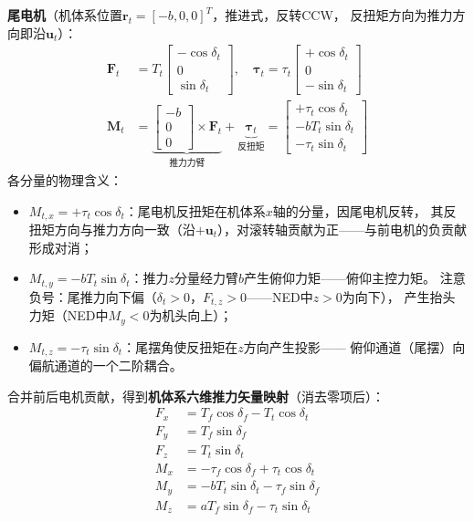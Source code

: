 \documentclass[a4paper,12pt]{ctexart}
\theoremstyle{plain}
\theoremstyle{definition}
\begin{document}
\textbf{尾电机}（机体系位置$\bm{r}_t = [-b, 0, 0]^T$，推进式，反转CCW，
反扭矩方向为推力方向即沿$\bm{u}_t$）：
\begin{align}
    \bm{F}_t &= T_t \begin{bmatrix} -\cos\delta_t \\ 0 \\ \sin\delta_t \end{bmatrix},
    \quad
    \bm{\tau}_t = \tau_t \begin{bmatrix} +\cos\delta_t \\ 0 \\ -\sin\delta_t \end{bmatrix}
    \label{eq:rear_force} \\
    \bm{M}_t &= \underbrace{\begin{bmatrix} -b \\ 0 \\ 0 \end{bmatrix} \times \bm{F}_t}_{\text{推力力臂}}
             + \underbrace{\bm{\tau}_t}_{\text{反扭矩}}
             = \begin{bmatrix}
                 +\tau_t \cos\delta_t \\
                 -b T_t \sin\delta_t \\
                 -\tau_t \sin\delta_t
               \end{bmatrix}
    \label{eq:rear_moment}
\end{align}
各分量的物理含义：
\begin{itemize}
    \item $M_{t,x} = +\tau_t \cos\delta_t$：尾电机反扭矩在机体系$x$轴的分量，因尾电机反转，
          其反扭矩方向与推力方向一致（沿$+\bm{u}_t$），对滚转轴贡献为正——与前电机的负贡献形成对消；
    \item $M_{t,y} = -b T_t \sin\delta_t$：推力$z$分量经力臂$b$产生俯仰力矩——俯仰主控力矩。
          注意负号：尾推力向下偏（$\delta_t>0$，$F_{t,z}>0$——NED中$z>0$为向下），
          产生抬头力矩（NED中$M_y<0$为机头向上）；
    \item $M_{t,z} = -\tau_t \sin\delta_t$：尾摆角使反扭矩在$z$方向产生投影——
          俯仰通道（尾摆）向偏航通道的一个二阶耦合。
\end{itemize}

合并前后电机贡献，得到\textbf{机体系六维推力矢量映射}（消去零项后）：
\begin{equation}
    \boxed{
    \begin{aligned}
        F_x &= T_f \cos\delta_f - T_t \cos\delta_t \\[2pt]
        F_y &= T_f \sin\delta_f \\[2pt]
        F_z &= T_t \sin\delta_t \\[6pt]
        M_x &= -\tau_f \cos\delta_f + \tau_t \cos\delta_t \\[2pt]
        M_y &= -b T_t \sin\delta_t - \tau_f \sin\delta_f \\[2pt]
        M_z &= a T_f \sin\delta_f - \tau_t \sin\delta_t
    \end{aligned}}
    \label{eq:six_component}
\end{equation}
\end{document}
